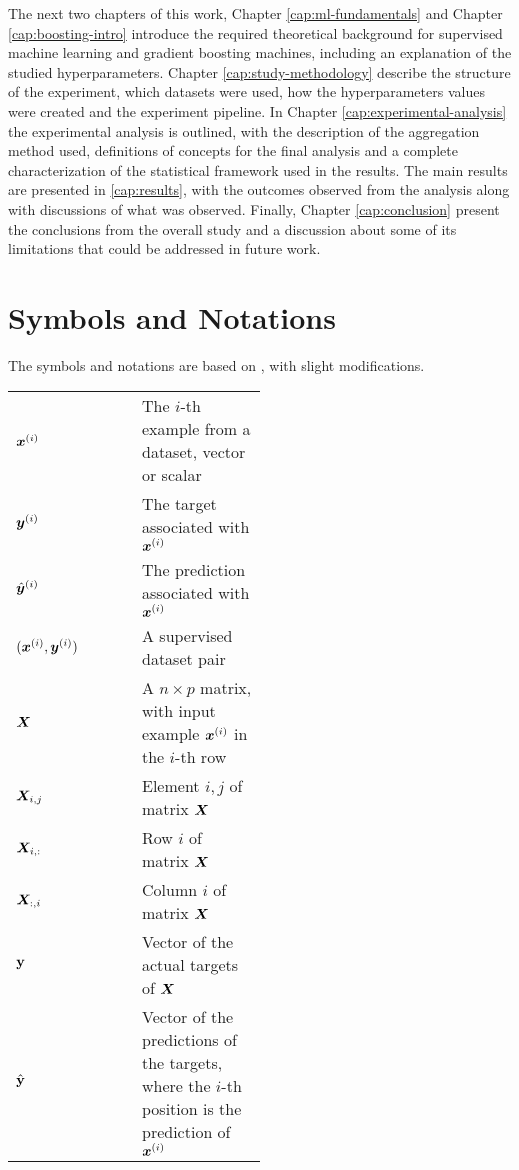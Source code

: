 The next two chapters of this work, Chapter \ref{cap:ml-fundamentals} and Chapter \ref{cap:boosting-intro} introduce the required theoretical background for supervised machine learning and gradient boosting machines, including an explanation of the studied hyperparameters. Chapter \ref{cap:study-methodology} describe the structure of the experiment, which datasets were used, how the hyperparameters values were created and the experiment pipeline. In Chapter \ref{cap:experimental-analysis} the experimental analysis is outlined, with the description of the aggregation method used, definitions of concepts for the final analysis and a complete characterization of the statistical framework used in the results. The main results are presented in \ref{cap:results}, with the outcomes observed from the analysis along with discussions of what was observed. Finally, Chapter \ref{cap:conclusion} present the conclusions from the overall study and a discussion about some of its limitations that could be addressed in future work.

\section{Symbols and Notations}
\label{sec:notation}

The symbols and notations are based on \cite{Goodfellow-et-al-2016}, with slight modifications.

\begin{center}
\begin{tabular}{l p{0.5\linewidth}}
$\bm{x}^{(i)}$ & The $i$-th example from a dataset, vector or scalar\\
$\bm{y}^{(i)}$ & The target associated with $\bm{x}^{(i)}$\\
$\hat{\bm{y}}^{(i)}$ & The prediction associated with $\bm{x}^{(i)}$ \\
$(\bm{x}^{(i)},\bm{y}^{(i)})$ & A supervised dataset pair\\
$\bm{X}$ & A $n \times p$ matrix, with input example $\bm{x}^{(i)}$ in the $i$-th row\\
$\bm{X}_{i,j}$ & Element $i, j$ of matrix $\bm{X}$ \\
$\bm{X}_{i, :}$ & Row $i$ of matrix  $\bm{X}$ \\
$\bm{X}_{:, i}$ & Column $i$ of matrix $\bm{X}$ \\
$\textbf{\text{\textup{y}}}$ & Vector of the actual targets of $\bm{X}$\\
$\hat{\textbf{{\text{\textup{y}}}}}$ & Vector of the predictions of the targets, where the $i$-th position is the prediction of $\bm{x}^{(i)}$\\

\end{tabular}
\end{center}
